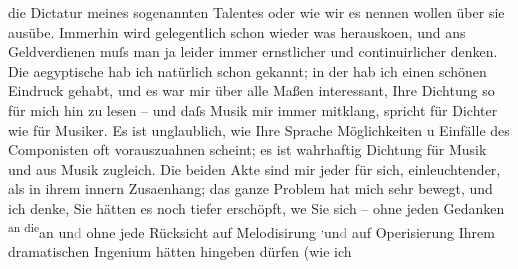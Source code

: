 \begin{ledgroupsized}[t]{13cm}
               die Dictatur meines sogenannten Talentes oder wie wir es nennen wollen über sie
               ausübe. Immerhin wird gelegentlich schon wieder was herausko{\geminationm}en, und ans Geldverdienen muſs man ja leider immer
               ernstlicher und continuirlicher denken.\pend
           \pstart
           Die aegyptische hab ich natürlich
               schon gekannt; in der \label{K_L02504_1v}\label{K_L02504_1h} hab ich
               einen schönen Eindruck gehabt, und es war mir über alle Maßen interessant, Ihre
               Dichtung so für mich hin zu lesen – und daſs Musik mir immer mitklang, spricht für
               Dichter wie für Musiker. Es ist unglaublich, wie Ihre Sprache Möglichkeiten u
               Einfälle des Componisten oft vorauszuahnen scheint; es ist wahrhaftig Dichtung für
               Musik und aus Musik zugleich. Die beiden Akte sind mir {\pb}jeder für sich, einleuchtender, als in ihrem innern Zusa{\geminationm}enhang; das ganze Problem hat mich sehr bewegt, und ich
               denke, Sie hätten es noch tiefer erschöpft, we{\geminationn} Sie sich
               – ohne jeden Gedanken \substVorne{}\textsuperscript{an die}{\allowbreak}\substDazwischen{}an\substHinten{} un\textcolor{gray}{d} ohne jede Rücksicht auf Melodisirung \substVorne{}\textsuperscript{,}\substDazwischen{}un\textcolor{gray}{d}\substHinten{} auf Operisierung Ihrem dramatischen Ingenium hätten hingeben dürfen (wie ich

\end{ledgroupsized}
